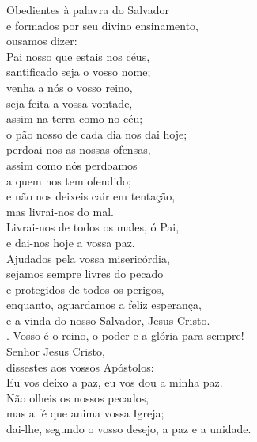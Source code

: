 \documentclass{book}
\begin{document}
\begin{flushleft}
    Obedientes à palavra do Salvador \\
    e formados por seu divino ensinamento, \\
    ousamos dizer:
    \vspace{.2cm} \\
    Pai nosso que estais nos céus, \\
    santificado seja o vosso nome; \\
    venha a nós o vosso reino, \\
    seja feita a vossa vontade, \\
    assim na terra como no céu; \\
    o pão nosso de cada dia nos dai hoje; \\
    perdoai-nos as nossas ofensas, \\
    assim como nós perdoamos \\
    a quem nos tem ofendido; \\
    e não nos deixeis cair em tentação, \\
    mas livrai-nos do mal.
    \vspace{.2cm} \\
    Livrai-nos de todos os males, ó Pai, \\
    e dai-nos hoje a vossa paz. \\
    Ajudados pela vossa misericórdia, \\
    sejamos sempre livres do pecado \\
    e protegidos de todos os perigos, \\
    enquanto, aguardamos a feliz esperança, \\
    e a vinda do nosso Salvador, Jesus Cristo.
    \vspace{.2cm} \\
    {\color{VioletRed2} \Rbar.} Vosso é o reino, o poder e a glória para sempre!
    \vspace{.2cm} \\
    Senhor Jesus Cristo, \\
    dissestes aos vossos Apóstolos: \\
    Eu vos deixo a paz, eu vos dou a minha paz. \\
    Não olheis os nossos pecados, \\
    mas a fé que anima vossa Igreja; \\
    dai-lhe, segundo o vosso desejo, a paz e a unidade.
    \vspace{.2cm} \\

\end{flushleft}
\end{document}
